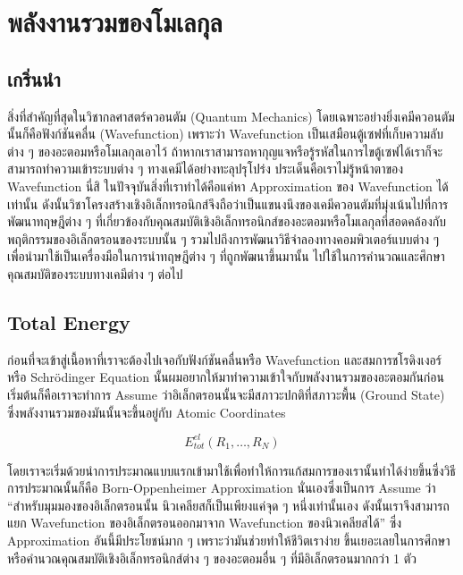 
\chapter{พลังงานรวมของโมเลกุล}

\section{เกริ่นนำ}

สิ่งที่สำคัญที่สุดในวิชากลศาสตร์ควอนตัม (Quantum Mechanics) โดยเฉพาะอย่างยิ่งเคมีควอนตัมนั้นก็คือฟังก์ชันคลื่น 
(Wavefunction) เพราะว่า Wavefunction เป็นเสมือนตู้เซฟที่เก็บความลับต่าง ๆ ของอะตอมหรือโมเลกุลเอาไว้
ถ้าหากเราสามารถหากุญแจหรือรู้รหัสในการไขตู้เซฟได้เราก็จะสามารถทำความเข้าระบบต่าง ๆ ทางเคมีได้อย่างทะลุปรุโปร่ง 
ประเด็นคือเราไม่รู้หน้าตาของ Wavefunction นี่สิ ในปัจจุบันสิ่งที่เราทำได้คือแค่หา Approximation ของ Wavefunction 
ได้เท่านั้น ดังนั้นวิชาโครงสร้างเชิงอิเล็กทรอนิกส์จึงถือว่าเป็นแขนงนึงของเคมีควอนตัมที่มุ่งเน้นไปที่การพัฒนาทฤษฎีต่าง ๆ 
ที่เกี่ยวข้องกับคุณสมบัติเชิงอิเล็กทรอนิกส์ของอะตอมหรือโมเลกุลที่สอดคล้องกับพฤติกรรมของอิเล็กตรอนของระบบนั้น ๆ 
รวมไปถึงการพัฒนาวิธีจำลองทางคอมพิวเตอร์แบบต่าง ๆ เพื่อนำมาใช้เป็นเครื่องมือในการนำทฤษฎีต่าง ๆ ที่ถูกพัฒนาขึ้นมานั้น 
ไปใช้ในการคำนวณและศึกษาคุณสมบัติของระบบทางเคมีต่าง ๆ ต่อไป

\section{Total Energy}

ก่อนที่จะเข้าสู่เนื้อหาที่เราจะต้องไปเจอกับฟังก์ชันคลื่นหรือ Wavefunction และสมการชโรดิงเงอร์หรือ Schr\"{o}dinger 
Equation นั้นผมอยากให้มาทำความเข้าใจกับพลังงานรวมของอะตอมกันก่อน เริ่มต้นก็คือเราจะทำการ Assume 
ว่าอิเล็กตรอนนั้นจะมีสภาวะปกติที่สภาวะพื้น (Ground State) ซึ่งพลังงานรวมของมันนั้นจะขึ้นอยู่กับ Atomic Coordinates

\begin{equation}
    E^{el}_{tot}(R_{1}, \dots, R_{N})
\end{equation}

โดยเราจะเริ่มด้วยนำการประมาณแบบแรกเข้ามาใช้เพื่อทำให้การแก้สมการของเรานั้นทำได้ง่ายขึ้นซึ่งวิธีการประมาณนั้นก็คือ 
Born-Oppenheimer Approximation นั่นเองซึ่งเป็นการ Assume ว่า \enquote{สำหรับมุมมองของอิเล็กตรอนนั้น 
นิวเคลียสก็เป็นเพียงแค่จุด ๆ หนึ่งเท่านั้นเอง ดังนั้นเราจึงสามารถแยก Wavefunction ของอิเล็กตรอนออกมาจาก 
Wavefunction ของนิวเคลียสได้} ซึ่ง Approximation อันนี้มีประโยชน์มาก ๆ เพราะว่ามันช่วยทำให้ชีวิตเราง่าย%
ขึ้นเยอะเลยในการศึกษาหรือคำนวณคุณสมบัติเชิงอิเล็กทรอนิกส์ต่าง ๆ ของอะตอมอื่น ๆ ที่มีอิเล็กตรอนมากกว่า 1 ตัว

